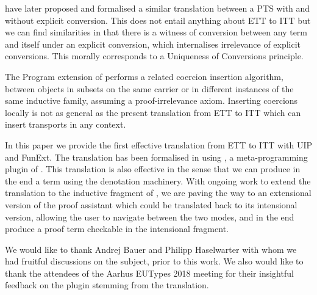  have later proposed and
formalised a similar translation between a PTS with and without explicit
conversion. This does not entail anything about ETT to ITT but we can
find similarities in that there is a witness of conversion between any
term and itself under an explicit conversion, which internalises
irrelevance of explicit conversions. This morally corresponds to a
Uniqueness of Conversions principle.

The Program  extension of \Coq performs a
related coercion insertion algorithm, between objects in subsets on the
same carrier or in different instances of the same inductive family,
assuming a proof-irrelevance axiom. Inserting coercions locally is not
as general as the present translation from ETT to ITT which can insert
transports in any context.

In this paper we provide the first effective translation from ETT to ITT
with UIP and FunExt. The translation has been
formalised in \Coq using \TemplateCoq, a meta-programming plugin of
\Coq. This translation is also effective in the sense that we can
produce in the end a \Coq term using the \TemplateCoq denotation
machinery.
%
With ongoing work to extend the translation to the inductive fragment
of \Coq, we are paving the way to an extensional version of the \Coq
proof assistant which could be translated back to its intensional
version, allowing the user to navigate between the two modes, and in
the end produce a proof term checkable in the intensional fragment.

  We would like to thank Andrej Bauer and Philipp Haselwarter with whom we had
  fruitful discussions on the subject, prior to this work.
  We also would like to thank the attendees of the Aarhus EUTypes 2018 meeting
  for their insightful feedback on the plugin stemming from the translation.
